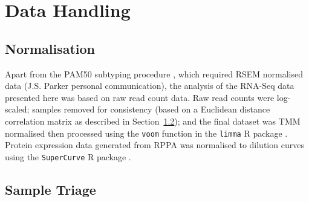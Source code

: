 \section{Data Handling}

\subsection{Normalisation}

Apart from the PAM50 subtyping procedure \citep{Parker2009}, which required RSEM normalised data (J.S. Parker personal communication), the analysis of the RNA-Seq data presented here was based on raw read count data. Raw read counts were log-scaled; samples removed for consistency (based on a Euclidean distance correlation matrix as described in Section~\ref{methods:sample_qc}); and the final dataset was TMM normalised \citep{Robinson2010} then processed using the \texttt{voom} function \citep{Law2014} in the \texttt{limma} R package \citep{limma}. Protein expression data generated from RPPA was normalised to dilution curves using the \texttt{SuperCurve} R package \citep{Neeley2009, Ju2015}.

\FloatBarrier

\subsection{Sample Triage} \label{methods:sample_qc}

